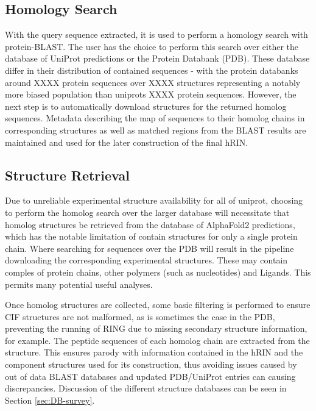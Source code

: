 \subsection{Homology Search}
With the query sequence extracted, it is used to perform a homology search with protein-BLAST. The user has the choice to perform this search over either the database of UniProt predictions or the Protein Databank (PDB). 
These database differ in their distribution of contained sequences - with the protein databanks around XXXX protein sequences over XXXX structures representing a notably more biased population than uniprots XXXX protein sequences. 
However, the next step is to automatically download structures for the returned homolog sequences. Metadata describing the map of sequences to their homolog chains in corresponding structures as well as matched regions from the BLAST results are maintained and used for the later construction of the final hRIN.

\subsection{Structure Retrieval}
Due to unreliable experimental structure availability for all of uniprot, choosing to perform the homolog search over the larger database will necessitate that homolog structures be retrieved from the database of AlphaFold2 predictions, which has the notable limitation of contain structures for only a single protein chain. Where searching for sequences over the PDB will result in the pipeline downloading the corresponding experimental structures. These may contain comples of protein chains, other polymers (such as nucleotides) and Ligands. This permits many potential useful analyses. %

Once homolog structures are collected, some basic filtering is performed to ensure CIF structures are not malformed, as is sometimes the case in the PDB, preventing the running of RING due to missing secondary structure information, for example. %
The peptide sequences of each homolog chain are extracted from the structure. This ensures parody with information contained in the hRIN and the component structures used for its construction, thus avoiding issues caused by out of data BLAST databases and updated PDB/UniProt entries can causing discrepancies. 
Discussion of the different structure databases can be seen in Section \ref{sec:DB-survey}.

